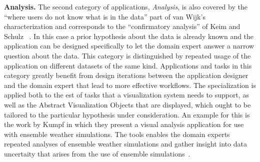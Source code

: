 \textbf{Analysis. }  The second category of applications, \emph{Analysis}, is also covered by the ``where users do not know what is in the data'' part of van Wijk's characterization and corresponds to the ``confirmatory analysis'' of Keim \etal and Schulz \etal\ .  In this case a prior hypothesis about the data is already known and the application can be designed specifically to let the domain expert answer a narrow question about the data.  This category is distinguished by repeated usage of the application on different datasets of the same kind.  Applications and tasks in this category greatly benefit from design iterations between the application designer and the domain expert that lead to more effective workflows.  The specialization is applied both to the est of tasks that a visualization system needs to support, as well as the Abstract Visualization Objects that are displayed, which ought to be tailored to the particular hypothesis under consideration.  An example for this is the work by Kumpf \etal in which they present a visual analysis application for use with ensemble weather simulations.  The tools enables the domain experts repeated analyses of ensemble weather simulations and gather insight into data uncertaity that arises from the use of ensemble simulations~\cite{kumpf2018visualizing}.

